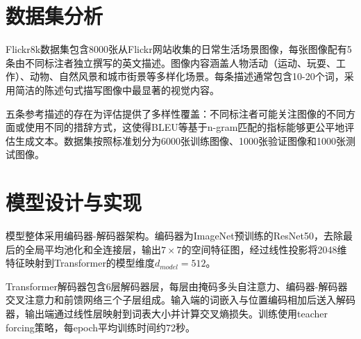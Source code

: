 \documentclass[12pt,a4paper]{article}
\begin{document}
\section{数据集分析}

Flickr8k数据集包含8000张从Flickr网站收集的日常生活场景图像，每张图像配有5条由不同标注者独立撰写的英文描述。图像内容涵盖人物活动（运动、玩耍、工作）、动物、自然风景和城市街景等多样化场景。每条描述通常包含10-20个词，采用简洁的陈述句式描写图像中最显著的视觉内容。

五条参考描述的存在为评估提供了多样性覆盖：不同标注者可能关注图像的不同方面或使用不同的措辞方式，这使得BLEU等基于n-gram匹配的指标能够更公平地评估生成文本。数据集按照标准划分为6000张训练图像、1000张验证图像和1000张测试图像。

\section{模型设计与实现}

模型整体采用编码器-解码器架构。编码器为ImageNet预训练的ResNet50，去除最后的全局平均池化和全连接层，输出$7\times7$的空间特征图，经过线性投影将2048维特征映射到Transformer的模型维度$d_{model}=512$。

\begin{table}[H]
\centering
\caption{模型配置参数}
\label{tab:config}
\end{table}

Transformer解码器包含6层解码器层，每层由掩码多头自注意力、编码器-解码器交叉注意力和前馈网络三个子层组成。输入端的词嵌入与位置编码相加后送入解码器，输出端通过线性层映射到词表大小并计算交叉熵损失。训练使用teacher forcing策略，每epoch平均训练时间约72秒。
\end{document}
